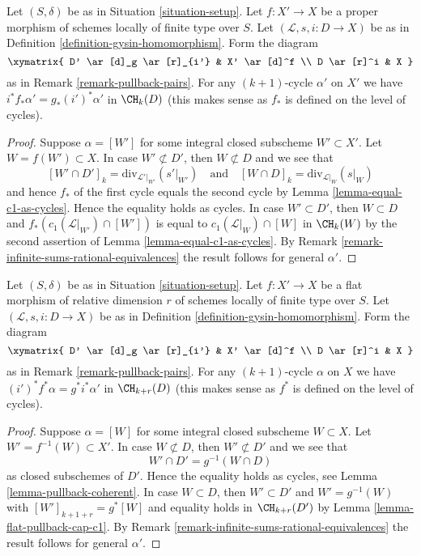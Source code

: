\begin{lemma}
\label{lemma-closed-in-X-gysin}
Let $(S, \delta)$ be as in Situation \ref{situation-setup}.
Let $f : X' \to X$ be a proper morphism of schemes
locally of finite type over $S$.
Let $(\mathcal{L}, s, i : D \to X)$ be as in
Definition \ref{definition-gysin-homomorphism}.
Form the diagram
$$
\xymatrix{
D' \ar[d]_g \ar[r]_{i'} & X' \ar[d]^f \\
D \ar[r]^i & X
}
$$
as in Remark \ref{remark-pullback-pairs}.
For any $(k + 1)$-cycle $\alpha'$ on $X'$ we have
$i^*f_*\alpha' = g_*(i')^*\alpha'$ in $\CH_k(D)$
(this makes sense as $f_*$ is defined on the level of cycles).
\end{lemma}

\begin{proof}
Suppose $\alpha = [W']$ for some integral closed subscheme
$W' \subset X'$. Let $W = f(W') \subset X$. In case $W' \not \subset D'$,
then $W \not \subset D$ and we see that
$$
[W' \cap D']_k = \text{div}_{\mathcal{L}'|_{W'}}({s'|_{W'}})
\quad\text{and}\quad
[W \cap D]_k = \text{div}_{\mathcal{L}|_W}(s|_W)
$$
and hence $f_*$ of the first cycle equals the second cycle by
Lemma \ref{lemma-equal-c1-as-cycles}. Hence the
equality holds as cycles. In case $W' \subset D'$, then
$W \subset D$ and $f_*(c_1(\mathcal{L}|_{W'}) \cap [W'])$
is equal to $c_1(\mathcal{L}|_W) \cap [W]$ in $\CH_k(W)$ by the second
assertion of Lemma \ref{lemma-equal-c1-as-cycles}.
By Remark \ref{remark-infinite-sums-rational-equivalences}
the result follows for general $\alpha'$.
\end{proof}

\begin{lemma}
\label{lemma-gysin-flat-pullback}
Let $(S, \delta)$ be as in Situation \ref{situation-setup}. Let $f : X' \to X$
be a flat morphism of relative dimension $r$ of schemes locally of finite type
over $S$. Let $(\mathcal{L}, s, i : D \to X)$ be as in
Definition \ref{definition-gysin-homomorphism}. Form the diagram
$$
\xymatrix{
D' \ar[d]_g \ar[r]_{i'} & X' \ar[d]^f \\
D \ar[r]^i & X
}
$$
as in Remark \ref{remark-pullback-pairs}.
For any $(k + 1)$-cycle $\alpha$ on $X$ we have
$(i')^*f^*\alpha = g^*i^*\alpha'$ in $\CH_{k + r}(D)$
(this makes sense as $f^*$ is defined on the level of cycles).
\end{lemma}

\begin{proof}
Suppose $\alpha = [W]$ for some integral closed subscheme
$W \subset X$. Let $W' = f^{-1}(W) \subset X'$. In case $W \not \subset D$,
then $W' \not \subset D'$ and we see that
$$
W' \cap D' = g^{-1}(W \cap D)
$$
as closed subschemes of $D'$. Hence the
equality holds as cycles, see Lemma \ref{lemma-pullback-coherent}.
In case $W \subset D$, then $W' \subset D'$ and $W' = g^{-1}(W)$
with $[W']_{k + 1 + r} = g^*[W]$ and equality holds in
$\CH_{k + r}(D')$ by Lemma \ref{lemma-flat-pullback-cap-c1}.
By Remark \ref{remark-infinite-sums-rational-equivalences}
the result follows for general $\alpha'$.
\end{proof}








